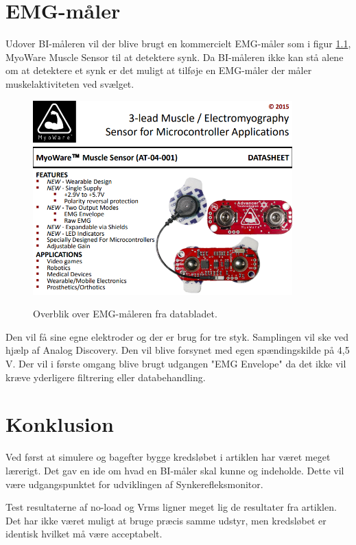 \chapter{EMG-måler}

Udover BI-måleren vil der blive brugt en kommercielt EMG-måler som i figur \ref{fig:emgdata}, MyoWare Muscle Sensor til at detektere synk. Da BI-måleren ikke kan stå alene om at detektere et synk er det muligt at tilføje en EMG-måler der måler muskelaktiviteten ved svælget. 

\begin{figure}[H]
\centering
{\includegraphics[width=10cm]
{Figure/emgdata}}
\caption{Overblik over EMG-måleren fra databladet.}
\label{fig:emgdata}
\end{figure}

Den vil få sine egne elektroder og der er brug for tre styk. Samplingen vil ske ved hjælp af Analog Discovery. Den vil blive forsynet med egen spændingskilde på 4,5 V. Der vil i første omgang blive brugt udgangen "EMG Envelope" da det ikke vil kræve yderligere filtrering eller databehandling.
 



\chapter{Konklusion}

Ved først at simulere og bagefter bygge kredsløbet i artiklen har været meget lærerigt. Det gav en ide om hvad en BI-måler skal kunne og indeholde. Dette vil være udgangspunktet for udviklingen af Synkerefleksmonitor.  

Test resultaterne af no-load og Vrms ligner meget lig de resultater fra artiklen. Det har ikke været muligt at bruge præcis samme udstyr, men kredsløbet er identisk hvilket må være acceptabelt.

